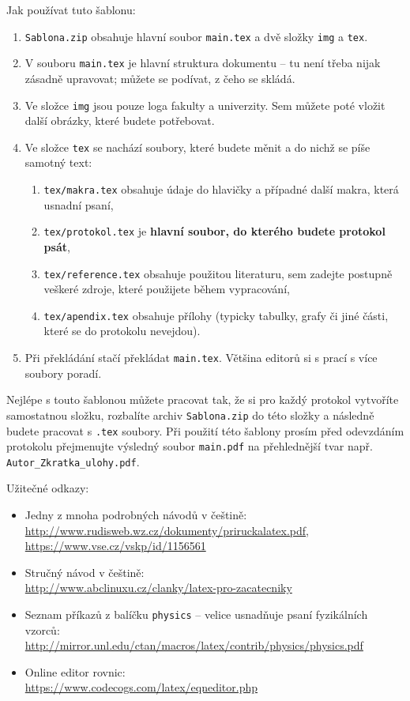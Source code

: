 		Jak používat tuto šablonu:
		\begin{enumerate}
		\item \verb|Sablona.zip| obsahuje hlavní soubor \verb|main.tex| a dvě složky \verb|img| a \verb|tex|. 
		\item V souboru \verb|main.tex| je hlavní struktura dokumentu -- tu není třeba nijak zásadně upravovat; můžete se podívat, z čeho se skládá.
		\item Ve složce \verb|img| jsou pouze loga fakulty a univerzity.  Sem můžete poté vložit další obrázky, které budete potřebovat.
		\item Ve složce \verb|tex| se nachází soubory, které budete měnit a do nichž se píše samotný text:
			\begin{enumerate}
			\item \verb|tex/makra.tex| obsahuje údaje do hlavičky a případné další makra, která usnadní psaní,
			\item \verb|tex/protokol.tex| je \textbf{hlavní soubor, do kterého budete protokol psát},
			\item \verb|tex/reference.tex| obsahuje použitou literaturu, sem zadejte postupně veškeré zdroje, které použijete během vypracování,
			\item \verb|tex/apendix.tex| obsahuje přílohy (typicky tabulky, grafy či jiné části, které se do protokolu nevejdou).
			\end{enumerate}
		\item Při překládání stačí překládat  \verb|main.tex|. Většina editorů si s prací s více soubory poradí.
		\end{enumerate}
		Nejlépe s touto šablonou můžete pracovat tak, že si pro každý protokol vytvoříte samostatnou složku, rozbalíte archiv \verb|Sablona.zip| do této složky a následně budete pracovat s \verb|.tex| soubory. Při použití této šablony prosím před odevzdáním protokolu přejmenujte výsledný soubor \verb|main.pdf| na přehlednější tvar např. \verb|Autor_Zkratka_ulohy.pdf|. 
		
		Užitečné odkazy:
		\begin{itemize}
		\item Jedny z mnoha podrobných návodů v češtině: \\
		\url{http://www.rudisweb.wz.cz/dokumenty/priruckalatex.pdf}, \url{https://www.vse.cz/vskp/id/1156561}
		\item Stručný návod v češtině: \\
		\url{http://www.abclinuxu.cz/clanky/latex-pro-zacatecniky}
		\item Seznam příkazů z balíčku \verb|physics| -- velice usnadňuje psaní fyzikálních vzorců:\\
		\url{http://mirror.unl.edu/ctan/macros/latex/contrib/physics/physics.pdf}
		\item Online editor rovnic: \\
		 \url{https://www.codecogs.com/latex/eqneditor.php}
		\end{itemize}
		
